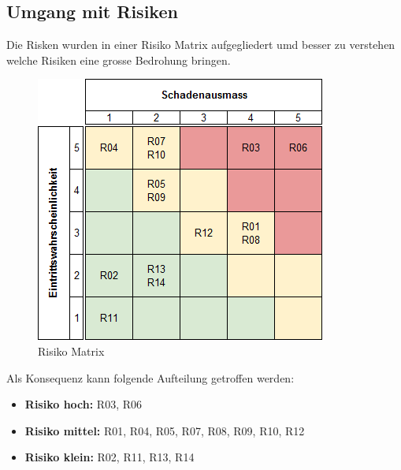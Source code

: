 \subsection{Umgang mit Risiken}
Die Risken wurden in einer Risiko Matrix aufgegliedert umd besser zu verstehen welche Risiken eine grosse Bedrohung bringen.

\begin{figure}[ht]
	\centering
	\includegraphics[scale=0.7]{images/risk_result.png}
	\caption{Risiko Matrix}
	\label{Risk result}
\end{figure}

Als Konsequenz kann folgende Aufteilung getroffen werden:
\begin{itemize}
	\item{\textbf{Risiko hoch: } R03, R06}
	\item{\textbf{Risiko mittel:} R01, R04, R05, R07, R08, R09, R10, R12 }
	\item{\textbf{Risiko klein:} R02, R11, R13, R14}
\end{itemize}
